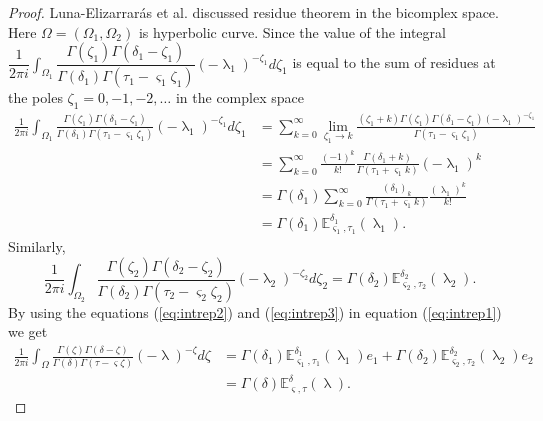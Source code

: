 \documentclass[a4paper,12pt]{article}
\theoremstyle{remark}
\begin{document}
\begin{proof}
    \noindent Luna-Elizarrar\'{a}s et al. \cite{meluna2021} discussed residue theorem in the bicomplex space. Here  $\Omega=(\Omega_1,\Omega_2)$ is hyperbolic curve.
\noindent	Since the value of the integral $\displaystyle\dfrac{1}{2\pi i}\int_{\Omega_1}	\dfrac{\Gamma(\zeta_1)\Gamma(\delta_1-\zeta_1)}{\Gamma(\delta_1)\Gamma(\tau_1- \varsigma_1 \zeta_1)}(-\uplambda_1 )^{-\zeta_1}d\zeta_1$ is equal to   the sum of residues at the poles \cite{gorenflo2014}
	$\zeta_1=0,-1,-2,\dots$ in the complex space \\
	\begin{equation}\label{eq:intrep2}
	\begin{split}
	\frac{1}{2\pi i}\int_{\Omega_1}	\frac{\Gamma(\zeta_1)\Gamma(\delta_1-\zeta_1)}{\Gamma(\delta_1)\Gamma(\tau_1- \varsigma_1 \zeta_1)}(-\uplambda_1 )^{-\zeta_1}d\zeta_1&=\sum_{k=0}^{\infty}\lim_{\zeta_1\to k}\frac{(\zeta_1+k)\Gamma(\zeta_1)\Gamma(\delta_1-\zeta_1)(-\uplambda_1 )^{-\zeta_1}}{\Gamma(\tau_1- \varsigma_1 \zeta_1)}\\
	&=\sum_{k=0}^{\infty}\frac{(-1)^k}{k !}\frac{\Gamma(\delta_1+k)}{\Gamma(\tau_1+ \varsigma_1k)} (-\uplambda_1 )^{k}\\
		&=\Gamma(\delta_1)\sum_{k=0}^{\infty}\frac{(\delta_1)_k}{\Gamma(\tau_1+ \varsigma_1k)}\frac{ (\uplambda_1 )^{k}}{k!}\\
		&=\Gamma(\delta_1)	\mathbb{E}^{\delta_1}_{ \varsigma_1,\tau_1}(\uplambda_1).
		\end{split}
	\end{equation}
	Similarly, 
	\begin{equation}\label{eq:intrep3}
\frac{1}{2\pi i}\int_{\Omega_2}	\frac{\Gamma(\zeta_2)\Gamma(\delta_2-\zeta_2)}{\Gamma(\delta_2)\Gamma(\tau_2- \varsigma_2 \zeta_2)}(-\uplambda_2 )^{-\zeta_2}d\zeta_2=\Gamma(\delta_2)	\mathbb{E}^{\delta_2}_{ \varsigma_2,\tau_2}(\uplambda_2).
	\end{equation}
	By using the equations (\ref{eq:intrep2}) and (\ref{eq:intrep3}) in equation (\ref{eq:intrep1}) we get 
		\begin{equation}
	\begin{split}
	\frac{1}{2\pi i}\int_{\Omega}	\frac{\Gamma(\zeta)\Gamma(\delta-\zeta)}{\Gamma(\delta)\Gamma(\tau- \varsigma \zeta)}(-\uplambda )^{-\zeta}d\zeta&=\Gamma(\delta_1)	\mathbb{E}^{\delta_1}_{ \varsigma_1,\tau_1}(\uplambda_1) e_1+\Gamma(\delta_2)	\mathbb{E}^{\delta_2}_{ \varsigma_2,\tau_2}(\uplambda_2) e_2\\
	&=\Gamma(\delta)	\mathbb{E}^\delta_{ \varsigma,\tau}(\uplambda).
	\end{split}        
	\end{equation}
	
\end{proof}
\end{document}
